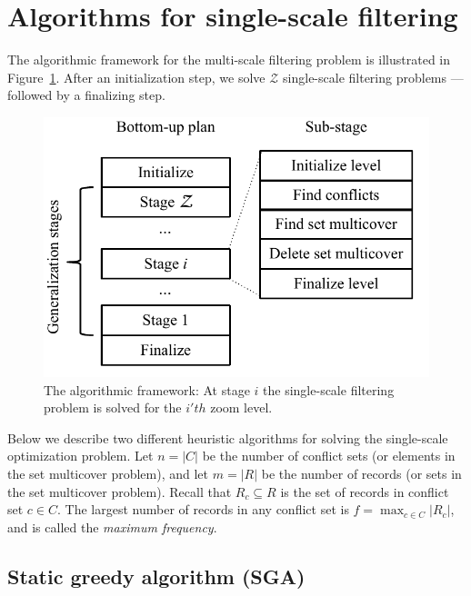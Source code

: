 \section{Algorithms for single-scale filtering}
\label{sec:algorithms}

The algorithmic framework for the multi-scale filtering problem is illustrated in Figure~\ref{fig:algorithmic-framework}. After an initialization step, we solve $\mathcal{Z}$ single-scale filtering problems --- followed by a finalizing step.

\begin{figure}[htbp]
\begin{center}
\includegraphics[scale=.6]{figs/cvl_stages.pdf}
\caption{The algorithmic framework: At stage $i$ the single-scale filtering problem is solved for the $i'th$ zoom level.}
\label{fig:algorithmic-framework}
\end{center}
\end{figure}

Below we describe two different heuristic algorithms for solving the single-scale optimization problem. Let $n=|C|$ be the number of conflict sets (or elements in the set multicover problem), and let $m=|R|$ be the number of records (or sets in the set multicover problem). Recall that $R_c \subseteq R$ is the set of records in conflict set $c \in C$. The largest number of records in any conflict set is $f = \max_{c \in C} |R_c|$, and is called the \emph{maximum frequency}.

\subsection{Static greedy algorithm (SGA)}
\label{sec:algorithms:sga}

